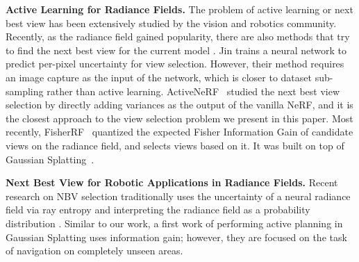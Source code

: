 
\textbf{Active Learning for Radiance Fields.} The problem of active learning or next best view has been extensively studied by the vision and robotics community.
Recently, as the radiance field gained popularity, there are also methods that try to find the next best view for the current model \cite{lin2022active}. Jin  trains a neural network to predict per-pixel uncertainty for view selection. However, their method requires an image capture as the input of the network, which is closer to dataset sub-sampling rather than active learning.
ActiveNeRF~\cite{pan2022activenerf} studied the next best view selection by directly adding variances as the output of the vanilla NeRF, and it is the closest approach to the view selection problem we present in this paper. Most recently, FisherRF~\cite{jiang2023fisherrf} quantized the expected Fisher Information Gain of candidate views on the radiance field, and selects views based on it. It was built on top of Gaussian Splatting~\cite{3dgs}.

\textbf{Next Best View for Robotic Applications in Radiance Fields.} Recent research on NBV selection traditionally uses the uncertainty of a neural radiance field via ray entropy \cite{lee2022uncertainty} and interpreting the radiance field as a probability distribution \cite{shen2024estimating}. Similar to our work, a first work of performing active planning in Gaussian Splatting \cite{jin2024gs} uses information gain; however, they are focused on the task of navigation on completely unseen areas.
